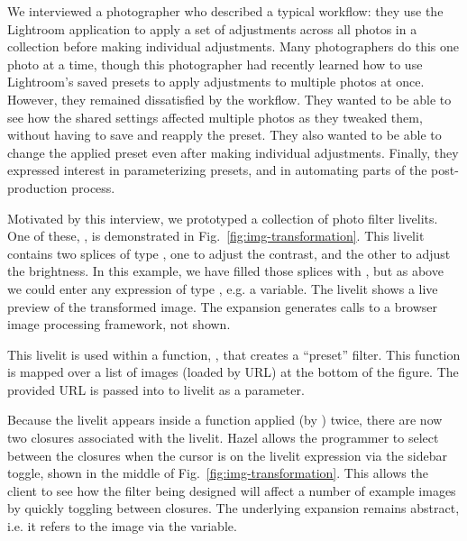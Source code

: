 We interviewed a photographer
who described a typical workflow:
they use the Lightroom application to
apply a set of adjustments
across all photos in a collection before making
individual adjustments.
Many photographers do this one photo at a time,
though this photographer had recently learned how to
use Lightroom's saved presets to
apply adjustments to multiple photos at once.
However, they remained dissatisfied by the workflow.
They wanted to be able to see how the shared settings affected
multiple photos as they tweaked them, without having to
save and reapply the preset.
They also wanted to be able to change the applied preset
even after making individual adjustments.
Finally, they
expressed interest in parameterizing
presets, and in automating parts of the post-production process.





Motivated by this interview,
we prototyped a collection of photo filter livelits.
One of these, , is demonstrated in Fig.~\ref{fig:img-transformation}. 
This livelit contains two splices of type ,
one to adjust the contrast, and the other to adjust the brightness.
In this example, we have filled those splices with , but
as above we could enter any expression of type , e.g. a variable.
The livelit shows a live preview of the transformed image.
The expansion generates calls to a browser image processing framework, 
not shown.

This livelit is used within a function, , that creates a ``preset'' filter. 
This function is mapped over a list of images (loaded by URL) at the bottom of the figure. 
The provided URL is passed into to livelit as a parameter.

Because the livelit appears inside a function applied (by ) twice, 
there are now two closures associated with the livelit. 
Hazel allows the programmer to select between the closures when 
the cursor is on the livelit expression via the sidebar toggle,
shown in the middle of Fig.~\ref{fig:img-transformation}.
This allows the client to see how the filter being designed will affect a
number of example images by quickly toggling between closures.
The underlying expansion remains abstract, i.e. it refers to the image via the  variable.

